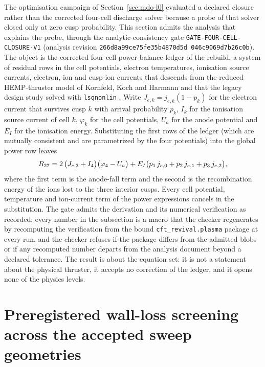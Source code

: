 \documentclass[11pt]{article}
\newcommand{\ClosureEvidenceRevision}{\texttt{266d8a99\allowbreak{}ce75fe35\allowbreak{}b4870d5d\allowbreak{}%
046c9069\allowbreak{}d7b26c0b}}
\begin{document}
The optimisation campaign of Section~\ref{sec:mdo-l0} evaluated a declared
closure rather than the corrected four-cell discharge solver because a probe of
that solver closed only at zero cusp probability. This section admits the
analysis that explains the probe, through the analytic-consistency gate
\texttt{GATE-FOUR-CELL-CLOSURE-V1} (analysis revision \ClosureEvidenceRevision).
The object is the corrected four-cell power-balance ledger of the rebuild, a
system of residual rows in the cell potentials, electron temperatures,
ionisation source currents, electron, ion and cusp-ion currents that descends
from the reduced HEMP-thruster model of Kornfeld, Koch and Harmann
\cite{Kornfeld2007} and that the legacy design study solved with
\texttt{lsqnonlin} \cite{Muffatti2017}. Write $J_{e,k}=j_{e,k}(1-p_k)$ for the
electron current that survives cusp $k$ with arrival probability $p_k$, $I_k$
for the ionisation source current of cell $k$, $\varphi_k$ for the cell
potentials, $U_a$ for the anode potential and $E_I$ for the ionisation energy.
Substituting the first \FccGlobalRowIndex{} rows of the ledger (which are
mutually consistent and are parametrized by the four potentials) into the global
power row leaves
\begin{equation}
  R_{27} = 2\,\bigl(J_{e,3}+I_4\bigr)
  \bigl(\varphi_4-U_a\bigr)
  + E_I\bigl(p_1\,j_{e,0}+p_2\,j_{e,1}+p_3\,j_{e,2}\bigr),
  \label{eq:four-cell-closed-form}
\end{equation}
where the first term is the anode-fall term and the second is the recombination
energy of the ions lost to the three interior cusps. Every cell potential,
temperature and ion-current term of the power expressions cancels in the
substitution. The gate admits the derivation and its numerical verification as
recorded: every number in the subsection is a macro that the checker regenerates
by recomputing the verification from the bound \texttt{cft\_revival.plasma}
package at every run, and the checker refuses if the package differs from the
admitted blobs or if any recomputed number departs from the analysis document
beyond a declared tolerance. The result is about the equation set: it is not a
statement about the physical thruster, it accepts no correction of the ledger,
and it opens none of the physics levels.



\section{Preregistered wall-loss screening across the accepted sweep geometries}
\label{sec:wall-loss-geometry-screening}
\end{document}

